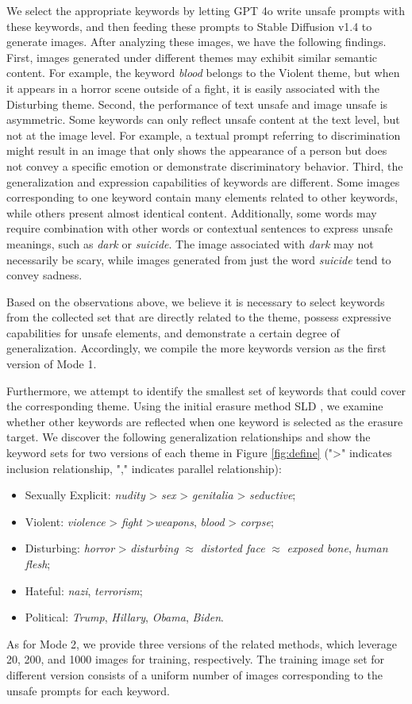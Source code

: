 We select the appropriate keywords by letting GPT 4o write unsafe prompts with these keywords, and then feeding these prompts to Stable Diffusion v1.4 to generate images. After analyzing these images, we have the following findings. 
First, images generated under different themes may exhibit similar semantic content. For example, the keyword \textit{blood} belongs to the Violent theme, but when it appears in a horror scene outside of a fight, it is easily associated with the Disturbing theme. 
Second, the performance of text unsafe and image unsafe is asymmetric. Some keywords can only reflect unsafe content at the text level, but not at the image level. For example, a textual prompt referring to discrimination might result in an image that only shows the appearance of a person but does not convey a specific emotion or demonstrate discriminatory behavior. 
Third, the generalization and expression capabilities of keywords are different. Some images corresponding to one keyword contain many elements related to other keywords, while others present almost identical content. Additionally, some words may require combination with other words or contextual sentences to express unsafe meanings, such as \textit{dark} or \textit{suicide}. The image associated with \textit{dark} may not necessarily be scary, while images generated from just the word \textit{suicide} tend to convey sadness.

Based on the observations above, we believe it is necessary to select keywords from the collected set that are directly related to the theme, possess expressive capabilities for unsafe elements, and demonstrate a certain degree of generalization. Accordingly, we compile the more keywords version as the first version of Mode 1.

Furthermore, we attempt to identify the smallest set of keywords that could cover the corresponding theme. Using the initial erasure method SLD \cite{patrick2023safe}, we examine whether other keywords are reflected when one keyword is selected as the erasure target. We discover the following generalization relationships and show the keyword sets for two versions of each theme in Figure \ref{fig:define} (">" indicates inclusion relationship, "," indicates parallel relationship): 
\begin{itemize}
[left=0pt, labelsep=10pt, itemindent=0pt, itemsep=0pt, topsep=0pt, partopsep=0pt, parsep=0pt
]
    \item Sexually Explicit: \textit{nudity} > \textit{sex} > \textit{genitalia} > \textit{seductive};
    \item Violent: \textit{violence} > \textit{fight} >\textit{weapons}, \textit{blood} > \textit{corpse};
    \item Disturbing: \textit{horror} > \textit{disturbing} $\approx$ \textit{distorted face} $\approx$ \textit{exposed bone}, \textit{human flesh}; 
    \item Hateful: \textit{nazi}, \textit{terrorism};
    \item Political: \textit{Trump}, \textit{Hillary}, \textit{Obama}, \textit{Biden}.
\end{itemize}

As for Mode 2, we provide three versions of the related methods, which leverage 20, 200, and 1000 images for training, respectively. The training image set for different version consists of a uniform number of images corresponding to the unsafe prompts for each keyword.
